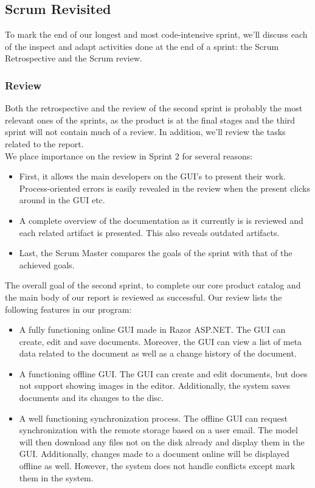 \subsection{Scrum Revisited}
To mark the end of our longest and most code-intensive sprint, we’ll discuss each of the inspect and adapt activities done at the end of a sprint: the Scrum Retrospective and the Scrum review.
\subsubsection{Review}
Both the retrospective and the review of the second sprint is probably the most relevant ones of the sprints, as the product is at the final stages and the third sprint will not contain much of a review. In addition, we’ll review the tasks related to the report. \\
We place importance on the review in Sprint 2 for several reasons:
\begin{itemize}
\item First, it allows the main developers on the GUI’s to present their work. Process-oriented errors is easily revealed in the review when the present clicks around in the GUI etc.
\item A complete overview of the documentation as it currently is is reviewed and each related artifact is presented. This also reveals outdated artifacts.
\item Last, the Scrum Master compares the goals of the sprint with that of the achieved goals. 
\end{itemize}
The overall goal of the second sprint, to complete our core product catalog and the main body of our report is reviewed as successful. Our review lists the following features in our program:
\begin{itemize}
\item A fully functioning online GUI made in Razor ASP.NET. The GUI can create, edit and save documents. Moreover, the GUI can view a list of meta data related to the document as well as a change history of the document.
\item A functioning offline GUI. The GUI can create and edit documents, but does not support showing images in the editor. Additionally, the system saves documents and its changes to the disc.
\item A well functioning synchronization process. The offline GUI can request synchronization with the remote storage based on a user email. The model will then download any files not on the disk already and display them in the GUI. Additionally, changes made to a document online will be displayed offline as well. However, the system does not handle conflicts except mark them in the system.
\end{itemize}
